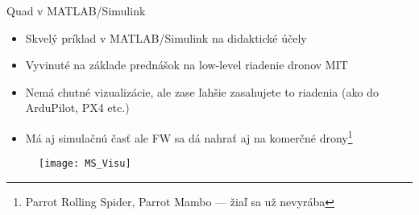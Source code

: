 \begin{frame}{Quad v MATLAB/Simulink}
\begin{itemize}
\item<1-> Skvelý príklad v MATLAB/Simulink na didaktické účely
\item<2-> Vyvinuté na základe prednášok na low-level riadenie dronov MIT \citep{Riether2016}
\item<3-> Nemá chutné vizualizácie, ale zase ľahšie zasahujete to riadenia (ako do ArduPilot, PX4 etc.)
    \item<4-> Má aj simulačnú časť ale FW sa dá nahrať aj na komerčné drony\footnote{Parrot Rolling Spider, Parrot Mambo --- žiaľ sa už nevyrába}

\end{itemize}
  \begin{figure}
\centering
  \texttt{[image: MS\_Visu]}\\
\end{figure}
\end{frame}

